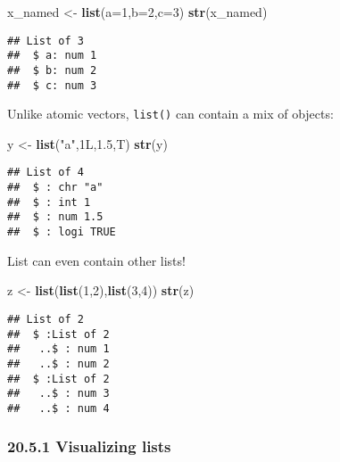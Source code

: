 \documentclass[
]{article}
\newenvironment{Shaded}{\begin{snugshade}}{\end{snugshade}}
\newcommand{\AttributeTok}[1]{\textcolor[rgb]{0.13,0.29,0.53}{#1}}
\newcommand{\DecValTok}[1]{\textcolor[rgb]{0.00,0.00,0.81}{#1}}
\newcommand{\FloatTok}[1]{\textcolor[rgb]{0.00,0.00,0.81}{#1}}
\newcommand{\FunctionTok}[1]{\textcolor[rgb]{0.13,0.29,0.53}{\textbf{#1}}}
\newcommand{\NormalTok}[1]{#1}
\newcommand{\OtherTok}[1]{\textcolor[rgb]{0.56,0.35,0.01}{#1}}
\newcommand{\StringTok}[1]{\textcolor[rgb]{0.31,0.60,0.02}{#1}}
\begin{document}
\begin{Shaded}
\begin{Highlighting}[]
\NormalTok{x\_named }\OtherTok{\textless{}{-}} \FunctionTok{list}\NormalTok{(}\AttributeTok{a=}\DecValTok{1}\NormalTok{,}\AttributeTok{b=}\DecValTok{2}\NormalTok{,}\AttributeTok{c=}\DecValTok{3}\NormalTok{)}
\FunctionTok{str}\NormalTok{(x\_named)}
\end{Highlighting}
\end{Shaded}

\begin{verbatim}
## List of 3
##  $ a: num 1
##  $ b: num 2
##  $ c: num 3
\end{verbatim}

Unlike atomic vectors, \texttt{list()} can contain a mix of objects:

\begin{Shaded}
\begin{Highlighting}[]
\NormalTok{y }\OtherTok{\textless{}{-}} \FunctionTok{list}\NormalTok{(}\StringTok{"a"}\NormalTok{,1L,}\FloatTok{1.5}\NormalTok{,T)}
\FunctionTok{str}\NormalTok{(y)}
\end{Highlighting}
\end{Shaded}

\begin{verbatim}
## List of 4
##  $ : chr "a"
##  $ : int 1
##  $ : num 1.5
##  $ : logi TRUE
\end{verbatim}

List can even contain other lists!

\begin{Shaded}
\begin{Highlighting}[]
\NormalTok{z }\OtherTok{\textless{}{-}} \FunctionTok{list}\NormalTok{(}\FunctionTok{list}\NormalTok{(}\DecValTok{1}\NormalTok{,}\DecValTok{2}\NormalTok{),}\FunctionTok{list}\NormalTok{(}\DecValTok{3}\NormalTok{,}\DecValTok{4}\NormalTok{))}
\FunctionTok{str}\NormalTok{(z)}
\end{Highlighting}
\end{Shaded}

\begin{verbatim}
## List of 2
##  $ :List of 2
##   ..$ : num 1
##   ..$ : num 2
##  $ :List of 2
##   ..$ : num 3
##   ..$ : num 4
\end{verbatim}

\hypertarget{visualizing-lists}{%
\subsubsection{20.5.1 Visualizing lists}\label{visualizing-lists}}
\end{document}
